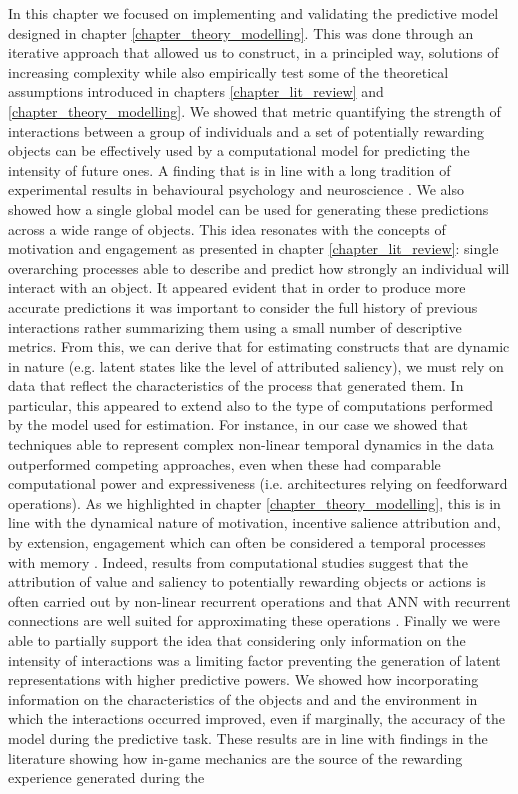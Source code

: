 In this chapter we focused on implementing and validating the predictive model designed in chapter \ref{chapter_theory_modelling}. This was done through an iterative approach that allowed us to construct, in a principled way, solutions of increasing complexity while also empirically test some of the theoretical assumptions introduced in chapters \ref{chapter_lit_review} and \ref{chapter_theory_modelling}. We showed that metric quantifying the strength of interactions between a group of individuals and a set of potentially rewarding objects can be effectively used by a computational model for predicting the intensity of future ones. A finding that is in line with a long tradition of experimental results in behavioural psychology \cite{thorndike1927law, skinner1953science} and neuroscience \cite{schultz1997neural, berridge2004motivation}. We also showed how a single global model can be used for generating these predictions across a wide range of objects. This idea resonates with the concepts of motivation and engagement as presented in chapter \ref{chapter_lit_review}: single overarching processes able to describe and predict how strongly an individual will interact with an object. It appeared evident that in order to produce more accurate predictions it was important to consider the full history of previous interactions rather summarizing them using a small number of descriptive metrics. From this, we can derive that for estimating constructs that are dynamic in nature (e.g. latent states like the level of attributed saliency), we must rely on data that reflect the characteristics of the process that generated them. In particular, this appeared to extend also to the type of computations performed by the model used for estimation. For instance, in our case we showed that techniques able to represent complex non-linear temporal dynamics in the data outperformed competing approaches, even when these had comparable computational power and expressiveness (i.e. architectures relying on feedforward operations). As we highlighted in chapter \ref{chapter_theory_modelling}, this is in line with the dynamical nature of motivation, incentive salience attribution and, by extension, engagement which can often be considered a temporal processes with memory \cite{toates1994comparing,robinson1993neural,zhang2009neural,tindell2009dynamic,berridge2012prediction}. Indeed, results from computational studies suggest that the attribution of value and saliency to potentially rewarding objects or actions is often carried out by non-linear recurrent operations \cite{song2017reward,wang2018prefrontal} and that ANN with recurrent connections are well suited for approximating these operations \cite{kietzmann2018deep}. Finally we were able to partially support the idea that considering only information on the intensity of interactions was a limiting factor preventing the generation of latent representations with higher predictive powers. We showed how incorporating information on the characteristics of the objects and and the environment in which the interactions occurred improved, even if marginally, the accuracy of the model during the predictive task. These results are in line with findings in the literature showing how in-game mechanics are the source of the rewarding experience generated during the 